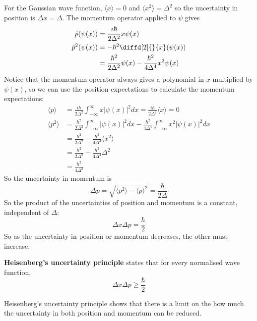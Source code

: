 \begin{example}
	For the Gaussian wave function, $\langle x \rangle = 0$ and $\langle x^2 \rangle = \Delta^2$ so the uncertainty in position is $\Delta x = \Delta$. The momentum operator applied to $\psi$ gives
	\[
		\begin{aligned}
			\hat{p} (\psi(x)) & = \frac{i \hbar}{2 \Delta^2} x \psi(x) \\
			\hat{p}^2 (\psi(x))
				& = -\hbar^2 \diffd[2]{}{x} (\psi(x)) \\
				& = \frac{\hbar^2}{2 \Delta^2} \psi(x) - \frac{\hbar^2}{4 \Delta^4} x^2 \psi(x)
		\end{aligned}
	\]
	Notice that the momentum operator always gives a polynomial in $x$ multiplied by $\psi(x)$, so we can use the position expectations to calculate the momentum expectations:
	\[
		\begin{aligned}
			\langle p \rangle & = \frac{i \hbar}{2 \Delta^2} \int_{-\infty}^{\infty} x |\psi(x)|^2 dx = \frac{i \hbar}{2 \Delta^2} \langle x \rangle = 0 \\
			\langle p^2 \rangle
				& = \frac{\hbar^2}{2 \Delta^2} \int_{-\infty}^{\infty} |\psi(x)|^2 dx - \frac{\hbar^2}{4 \Delta^4} \int_{-\infty}^{\infty} x^2 |\psi(x)|^2 dx \\
				& = \frac{\hbar^2}{2 \Delta^2} - \frac{\hbar^2}{4 \Delta^4} \langle x^2 \rangle \\
				& = \frac{\hbar^2}{2 \Delta^2} - \frac{\hbar^2}{4 \Delta^4} \Delta^2 \\
				& = \frac{\hbar^2}{4 \Delta^2}
		\end{aligned}
	\]
	So the uncertainty in momentum is
	\[
		\Delta p = \sqrt{\langle p^2 \rangle - {\langle p \rangle}^2} = \frac{\hbar}{2 \Delta}
	\]
	So the product of the uncertainties of position and momentum is a constant, independent of $\Delta$:
	\[
		\Delta x \Delta p = \frac{\hbar}{2}
	\]
	So as the uncertainty in position or momentum decreases, the other must increase.
\end{example}

\begin{definition}
	\textbf{Heisenberg's uncertainty principle} states that for every normalised wave function,
	\[
		\Delta x \Delta p \ge \frac{\hbar}{2}
	\]
\end{definition}

\begin{remark}
	Heisenberg's uncertainty principle shows that there is a limit on the how much the uncertainty in both position and momentum can be reduced.
\end{remark}

